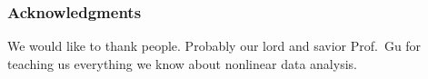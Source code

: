 \documentclass{article}
\begin{document}
\subsubsection*{Acknowledgments}

We would like to thank people. Probably our lord and savior Prof.\ Gu for teaching us everything we know about nonlinear data analysis.\cite{dyson1970correlations}





\end{document}
